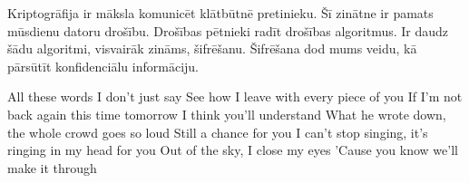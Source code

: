 \documentclass[a4paper,11pt]{article}
\begin{document}
\begin{displayquote}
Kriptogrāfija ir māksla komunicēt klātbūtnē pretinieku. Šī zinātne ir pamats mūsdienu datoru drošību. Drošības pētnieki radīt drošības algoritmus. Ir daudz šādu algoritmi, visvairāk zināms, šifrēšanu. Šifrēšana dod mums veidu, kā pārsūtīt konfidenciālu informāciju.
\end{displayquote}

\begin{displayquote}
All these words I don't just say
See how I leave with every piece of you
If I'm not back again this time tomorrow
I think you'll understand
What he wrote down, the whole crowd goes so loud
Still a chance for you
I can't stop singing, it's ringing in my head for you
Out of the sky, I close my eyes
'Cause you know we'll make it through
\end{displayquote}

\newpage
\raggedright


\end{document}
